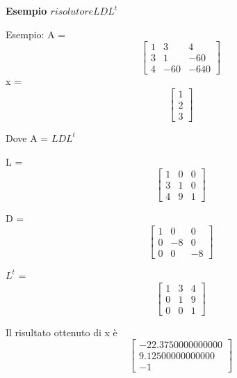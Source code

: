 

\begin{flushleft}
	\textbf{Esempio $risolutoreLDL^t$}
	
	Esempio: 
	A = 
	\[\begin{bmatrix}
		1 & 3   & 4    \\ 
		3 & 1   & -60  \\
		4 & -60 & -640 
	\end{bmatrix}\]
	x =
	\[\begin{bmatrix}
		1 \\
		2 \\
		3 
	\end{bmatrix}\]
	
	Dove A = $LDL^t$
	
	L = 
	\[\begin{bmatrix}
		1 & 0 & 0 \\ 
		3 & 1 & 0 \\
		4 & 9 & 1 
	\end{bmatrix}\]
	
	D = 
	\[\begin{bmatrix}
		1 & 0  & 0  \\ 
		0 & -8 & 0  \\
		0 & 0  & -8 
	\end{bmatrix}\]
	
	
	$L^t$ = 
	\[\begin{bmatrix}
		1 & 3 & 4 \\ 
		0 & 1 & 9 \\
		0 & 0 & 1 
	\end{bmatrix}\]
	
	Il risultato ottenuto di x è
	\[\begin{bmatrix}
		-22.3750000000000 \\
		9.12500000000000  \\
		-1                
	\end{bmatrix}\]
	
\end{flushleft}

